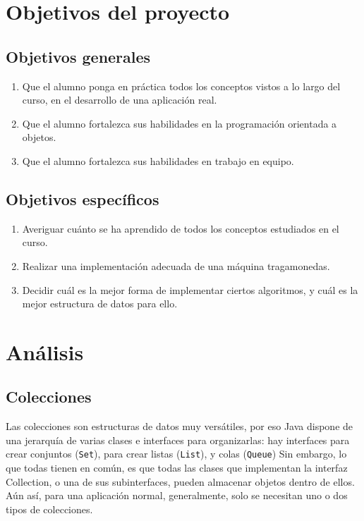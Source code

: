 \documentclass[letterpaper,12pt]{article}
\begin{document}

\section{Objetivos del proyecto}
\subsection{Objetivos generales}
\begin{enumerate}
\item Que el alumno ponga en práctica todos los conceptos vistos a lo largo del curso, en el desarrollo de una aplicación real.
\item Que el alumno fortalezca sus habilidades en la programación orientada a objetos.
\item Que el alumno fortalezca sus habilidades en trabajo en equipo.
\end{enumerate}

\subsection{Objetivos específicos}
\begin{enumerate}
\item Averiguar cuánto se ha aprendido de todos los conceptos estudiados en el curso.
\item Realizar una implementación adecuada de una máquina tragamonedas.
\item Decidir cuál es la mejor forma de implementar ciertos algoritmos, y cuál es la mejor estructura de datos para ello.
\end{enumerate}

\section{Análisis}
\subsection{Colecciones}
Las colecciones son estructuras de datos muy versátiles, por eso Java dispone de una jerarquía de varias clases e interfaces para organizarlas: hay interfaces para crear conjuntos (\texttt{Set}), para crear listas (\texttt{List}), y colas (\texttt{Queue}) Sin embargo, lo que todas tienen en común, es que todas las clases que implementan la interfaz Collection, o una de sus subinterfaces, pueden almacenar objetos dentro de ellos. Aún así, para una aplicación normal, generalmente, solo se necesitan uno o dos tipos de colecciones.
\end{document}
